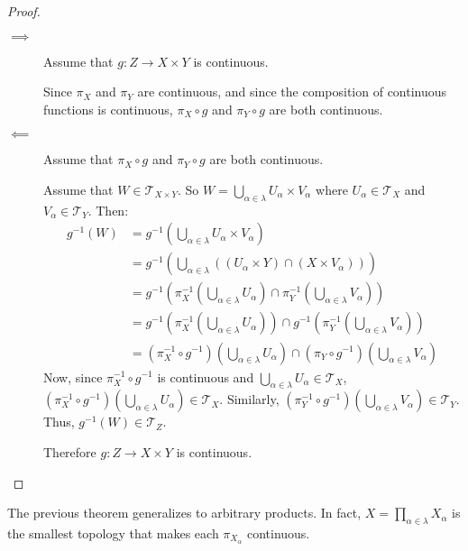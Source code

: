 \documentclass[letterpaper,12pt,fleqn]{article}
\newcommand{\T}{\mathscr{T}}
\renewcommand{\a}{\alpha}
\renewcommand{\l}{\lambda}
\begin{document}
\begin{proof}
  \begin{description}
  \item[]
  \item[\(\implies\)] Assume that \(g:Z\to X\times Y\) is continuous.

    Since \(\pi_X\) and \(\pi_Y\) are continuous, and since the composition of continuous functions is continuous,
    \(\pi_X\circ g\) and \(\pi_Y\circ g\) are both continuous.

  \item[\(\impliedby\)] Assume that \(\pi_X\circ g\) and \(\pi_Y\circ g\) are both continuous.

    Assume that \(W\in\T_{X\times Y}\).  So \(W=\bigcup_{\a\in\l}U_{\a}\times V_{\a}\) where \(U_{\a}\in\T_X\) and
    \(V_{\a}\in\T_Y\).  Then:
    \begin{align*}
      g^{-1}(W) &= g^{-1}(\bigcup_{\a\in\l}U_{\a}\times V_{\a}) \\
      &= g^{-1}(\bigcup_{\a\in\l}((U_{\a}\times Y)\cap(X\times V_{\a}))) \\
      &= g^{-1}(\pi_X^{-1}(\bigcup_{\a\in\l}U_{\a})\cap\pi_Y^{-1}(\bigcup_{\a\in\l}V_{\a})) \\
      &= g^{-1}(\pi_X^{-1}(\bigcup_{\a\in\l}U_{\a}))\cap g^{-1}(\pi_Y^{-1}(\bigcup_{\a\in\l}V_{\a})) \\
      &= (\pi_X^{-1}\circ g^{-1})(\bigcup_{\a\in\l}U_{\a})\cap (\pi_Y\circ g^{-1})(\bigcup_{\a\in\l}V_{\a})
    \end{align*}
    Now, since \(\pi_X^{-1}\circ g^{-1}\) is continuous and \(\bigcup_{\a\in\l}U_{\a}\in\T_X\),
    \((\pi_X^{-1}\circ g^{-1})(\bigcup_{\a\in\l}U_{\a})\in\T_X\).  Similarly,
    \((\pi_Y^{-1}\circ g^{-1})(\bigcup_{\a\in\l}V_{\a})\in\T_Y\).  Thus, \(g^{-1}(W)\in\T_Z\).

    Therefore \(g:Z\to X\times Y\) is continuous.
  \end{description}
\end{proof}

The previous theorem generalizes to arbitrary products.  In fact, \(X=\prod_{\a\in\l}X_{\a}\) is the smallest
topology that makes each \(\pi_{X_{\a}}\) continuous.
\end{document}

